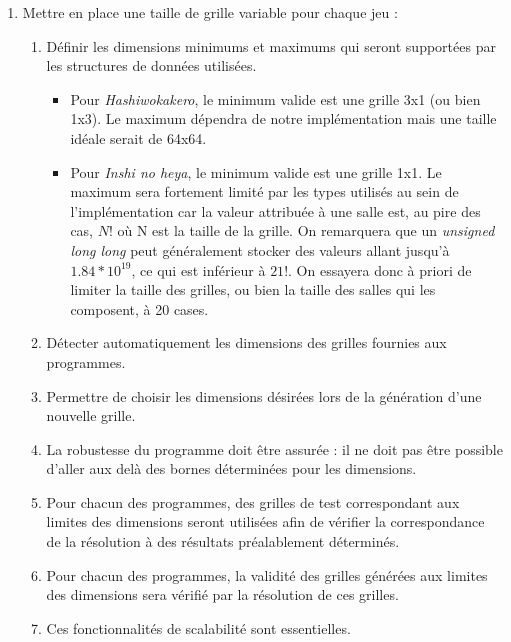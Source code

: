\documentclass[12pt]{article}
\begin{document}
\begin{enumerate}
\item \label {besoinF5} Mettre en place une taille de grille variable pour chaque jeu :
\begin{enumerate}
\item Définir les dimensions minimums et maximums qui seront supportées par les structures de données utilisées.
\begin{itemize}
\item Pour \textit{Hashiwokakero}, le minimum valide est une grille 3x1 (ou bien 1x3). Le maximum dépendra de notre implémentation mais une taille idéale serait de 64x64.
\item Pour \textit{Inshi no heya}, le minimum valide est une grille 1x1. Le maximum sera fortement limité par les types utilisés au sein de l'implémentation car la valeur attribuée à une salle est, au pire des cas, $N!$ où N est la taille de la grille. On remarquera que un \textit{unsigned long long} peut généralement stocker des valeurs allant jusqu'à $1.84*10^{19}$, ce qui est inférieur à $21!$. On essayera donc à priori de limiter la taille des grilles, ou bien la taille des salles qui les composent, à 20 cases.
\end{itemize}
\item Détecter automatiquement les dimensions des grilles fournies aux programmes.
\item Permettre de choisir les dimensions désirées lors de la génération d'une nouvelle grille.
\item La robustesse du programme doit être assurée : il ne doit pas être possible d'aller aux delà des bornes déterminées pour les dimensions.
\item Pour chacun des programmes, des grilles de test correspondant aux limites des dimensions seront utilisées afin de vérifier la correspondance de la résolution à des résultats préalablement déterminés.
\item Pour chacun des programmes, la validité des grilles générées aux limites des dimensions sera vérifié par la résolution de ces grilles.
\item Ces fonctionnalités de scalabilité sont essentielles.
\end{enumerate}

\end{enumerate}
\end{document}
